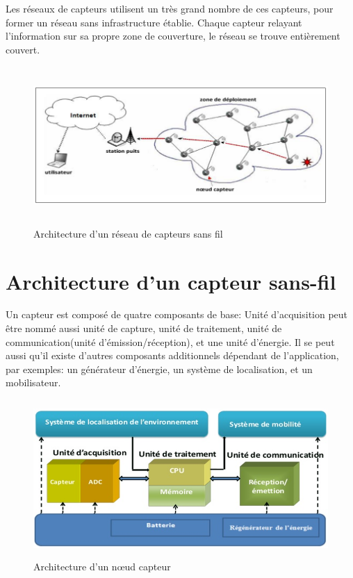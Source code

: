 Les réseaux de capteurs utilisent un très grand nombre de ces capteurs, pour former un réseau sans infrastructure établie. Chaque capteur relayant l'information sur sa propre zone de couverture, le réseau se trouve entièrement couvert.\\
\begin{figure}[H]
	\centering
	\includegraphics[width=14cm,height=6cm]{Chap1/2.png}
	\caption{Architecture d’un réseau de capteurs sans fil}
	\label{fig:ARCSF}
\end{figure}

\section{Architecture d’un capteur sans-fil}
Un capteur est composé de quatre composants de base: Unité d’acquisition peut être nommé aussi unité de capture, unité de traitement, unité de communication(unité d'émission/réception), et une unité d'énergie. 
Il se peut aussi qu'il existe d'autres composants additionnels dépendant de l'application, par exemples: un générateur d'énergie, un système de localisation, et un mobilisateur.\cite{mekidicheetude}\\
\begin{figure}[H]
	\centering
	\includegraphics[width=14cm,height=6cm]{Chap1/3.png}
	\caption{Architecture d’un nœud capteur}
	\label{fig:ANC}
\end{figure}

